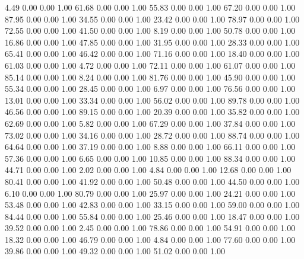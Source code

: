     4.49   0.00   0.00   1.00
   61.68   0.00   0.00   1.00
   55.83   0.00   0.00   1.00
   67.20   0.00   0.00   1.00
   87.95   0.00   0.00   1.00
   34.55   0.00   0.00   1.00
   23.42   0.00   0.00   1.00
   78.97   0.00   0.00   1.00
   72.55   0.00   0.00   1.00
   41.50   0.00   0.00   1.00
    8.19   0.00   0.00   1.00
   50.78   0.00   0.00   1.00
   16.86   0.00   0.00   1.00
   47.85   0.00   0.00   1.00
   31.95   0.00   0.00   1.00
   28.33   0.00   0.00   1.00
   65.41   0.00   0.00   1.00
   46.42   0.00   0.00   1.00
   71.16   0.00   0.00   1.00
   18.40   0.00   0.00   1.00
   61.03   0.00   0.00   1.00
    4.72   0.00   0.00   1.00
   72.11   0.00   0.00   1.00
   61.07   0.00   0.00   1.00
   85.14   0.00   0.00   1.00
    8.24   0.00   0.00   1.00
   81.76   0.00   0.00   1.00
   45.90   0.00   0.00   1.00
   55.34   0.00   0.00   1.00
   28.45   0.00   0.00   1.00
    6.97   0.00   0.00   1.00
   76.56   0.00   0.00   1.00
   13.01   0.00   0.00   1.00
   33.34   0.00   0.00   1.00
   56.02   0.00   0.00   1.00
   89.78   0.00   0.00   1.00
   46.56   0.00   0.00   1.00
   89.15   0.00   0.00   1.00
   20.39   0.00   0.00   1.00
   35.82   0.00   0.00   1.00
   62.69   0.00   0.00   1.00
    5.82   0.00   0.00   1.00
   67.29   0.00   0.00   1.00
   37.84   0.00   0.00   1.00
   73.02   0.00   0.00   1.00
   34.16   0.00   0.00   1.00
   28.72   0.00   0.00   1.00
   88.74   0.00   0.00   1.00
   64.64   0.00   0.00   1.00
   37.19   0.00   0.00   1.00
    8.88   0.00   0.00   1.00
   66.11   0.00   0.00   1.00
   57.36   0.00   0.00   1.00
    6.65   0.00   0.00   1.00
   10.85   0.00   0.00   1.00
   88.34   0.00   0.00   1.00
   44.71   0.00   0.00   1.00
    2.02   0.00   0.00   1.00
    4.84   0.00   0.00   1.00
   12.68   0.00   0.00   1.00
   80.41   0.00   0.00   1.00
   41.92   0.00   0.00   1.00
   50.48   0.00   0.00   1.00
   44.50   0.00   0.00   1.00
    6.10   0.00   0.00   1.00
   80.79   0.00   0.00   1.00
   25.97   0.00   0.00   1.00
   24.21   0.00   0.00   1.00
   53.48   0.00   0.00   1.00
   42.83   0.00   0.00   1.00
   33.15   0.00   0.00   1.00
   59.00   0.00   0.00   1.00
   84.44   0.00   0.00   1.00
   55.84   0.00   0.00   1.00
   25.46   0.00   0.00   1.00
   18.47   0.00   0.00   1.00
   39.52   0.00   0.00   1.00
    2.45   0.00   0.00   1.00
   78.86   0.00   0.00   1.00
   54.91   0.00   0.00   1.00
   18.32   0.00   0.00   1.00
   46.79   0.00   0.00   1.00
    4.84   0.00   0.00   1.00
   77.60   0.00   0.00   1.00
   39.86   0.00   0.00   1.00
   49.32   0.00   0.00   1.00
   51.02   0.00   0.00   1.00
